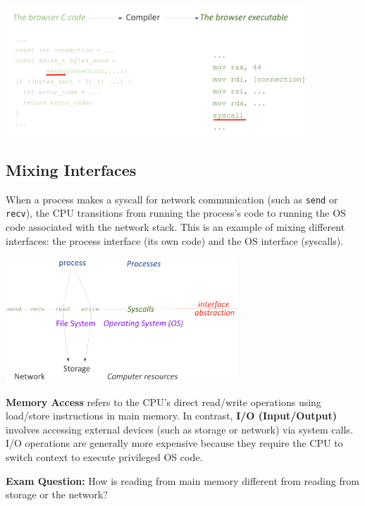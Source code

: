 \begin{center}
  \includegraphics[width=0.85\textwidth]{chapters/L1/images/syscalls2.png}
\end{center}
\newpage
\subsection{Mixing Interfaces}
When a process makes a syscall for network communication (such as \texttt{send} or \texttt{recv}), the CPU transitions from running the process’s code to running the OS code associated with the network stack. This is an example of mixing different interfaces: the process interface (its own code) and the OS interface (syscalls).
\begin{center}
  \includegraphics[width=0.65\textwidth]{chapters/L1/images/mix_int.png}
\end{center}
\vfill
\begin{definition}
\textbf{Memory Access} refers to the CPU’s direct read/write operations using load/store instructions in main memory. In contrast, \textbf{I/O (Input/Output)} involves accessing external devices (such as storage or network) via system calls. I/O operations are generally more expensive because they require the CPU to switch context to execute privileged OS code.
\end{definition}
\vspace{0.5em}
{\color{red}\textbf{Exam Question:} How is reading from main memory different from reading from storage or the network?}\\[0.5em]
